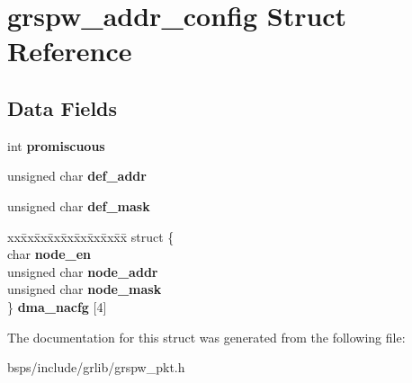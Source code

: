 \hypertarget{structgrspw__addr__config}{}\section{grspw\+\_\+addr\+\_\+config Struct Reference}
\label{structgrspw__addr__config}
\subsection*{Data Fields}
\begin{DoxyCompactItemize}
\item 
\mbox{\label{structgrspw__addr__config_a8962a9ac3f488f3cbd89cb5cabe20d3b}} 
int {\bfseries promiscuous}
\item 
\mbox{\label{structgrspw__addr__config_a6c25c1b686b5c686294212bad79b7172}} 
unsigned char {\bfseries def\+\_\+addr}
\item 
\mbox{\label{structgrspw__addr__config_a27a7a44d574ec25776448ba07b7ab2b5}} 
unsigned char {\bfseries def\+\_\+mask}
\item 
\mbox{\label{structgrspw__addr__config_adba43c7dc27fd001e5a908c51e5d60eb}} 
\begin{tabbing}
xx\=xx\=xx\=xx\=xx\=xx\=xx\=xx\=xx\=\kill
struct \{\\
\>char {\bfseries node\_en}\\
\>unsigned char {\bfseries node\_addr}\\
\>unsigned char {\bfseries node\_mask}\\
\} {\bfseries dma\_nacfg} \mbox{[}4\mbox{]}\\

\end{tabbing}\end{DoxyCompactItemize}


The documentation for this struct was generated from the following file\+:\begin{DoxyCompactItemize}
\item 
bsps/include/grlib/grspw\+\_\+pkt.\+h\end{DoxyCompactItemize}
